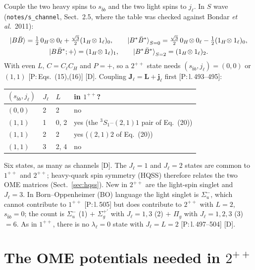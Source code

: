 \documentclass[11pt,a4paper]{article}
\newcommand{\tagP}[1]{\textcolor{blue!65!black}{\textsf{\small[P:\,#1]}}}
\newcommand{\tagD}{\textcolor{orange!85!black}{\textsf{\small[D]}}}
\newcommand{\BB}{B\bar B}
\newcommand{\BBst}{B\bar B^*}
\newcommand{\BstBst}{B^*\bar B^*}
\begin{document}
Couple the two heavy spins to $s_{\bar bb}$ and the two light spins to $j_\ell$. In $S$ wave (\texttt{notes/s\_channel}, Sect.~2.5, where the table was checked against Bondar \emph{et al.}\ 2011):
\begin{gather}
\ket{\BB}=\tfrac12\,0_H\!\otimes0_\ell+\tfrac{\sqrt3}{2}(1_H\!\otimes1_\ell)_0,\qquad
\ket{\BstBst}_{S=0}=\tfrac{\sqrt3}{2}\,0_H\!\otimes0_\ell-\tfrac12(1_H\!\otimes1_\ell)_0,\notag\\
\ket{\BBst;+}=(1_H\!\otimes1_\ell)_1,\qquad
\ket{\BstBst}_{S=2}=(1_H\!\otimes1_\ell)_2 .
\label{eq:hl}
\end{gather}
With even $L$, $C=C_\ell C_H$ and $P=+$, so a $2^{++}$ state needs $(s_{\bar bb},j_\ell)=(0,0)$ or $(1,1)$ \tagP{Eqs.~(15),(16)} \tagD. Coupling $\bm J_\ell=\bm L+\bm j_\ell$ first \tagP{l.\,493--495}:
\begin{center}
\small
\begin{tabular}{llll}
\toprule
$(s_{\bar bb},j_\ell)$ & $J_\ell$ & $L$ & in $1^{++}$?\\
\midrule
$(0,0)$ & 2 & 2 & no\\
$(1,1)$ & 1 & 0, 2 & yes (the $^3S_1$--$(2,1)1$ pair of Eq.~(20))\\
$(1,1)$ & 2 & 2 & yes ($(2,1)2$ of Eq.~(20))\\
$(1,1)$ & 3 & 2, 4 & no\\
\bottomrule
\end{tabular}
\end{center}
Six states, as many as channels \tagD. The $J_\ell=1$ and $J_\ell=2$ states are common to $1^{++}$ and $2^{++}$; heavy-quark spin symmetry (HQSS) therefore relates the two OME matrices (Sect.~\ref{sec:hqss}). New in $2^{++}$ are the light-spin singlet and $J_\ell=3$. In Born--Oppenheimer (BO) language the light singlet is $\Sigma_u^-$, which cannot contribute to $1^{++}$ \tagP{l.\,505} but does contribute to $2^{++}$ with $L=2$, $s_{\bar bb}=0$; the count is $\Sigma_u^-$ (1) $+$ $\Sigma_g^{+\prime}$ with $J_\ell=1,3$ (2) $+$ $\Pi_g$ with $J_\ell=1,2,3$ (3) $=6$. As in $1^{++}$, there is no $\lambda_\ell=0$ state with $J_\ell=L=2$ \tagP{l.\,497--504} \tagD.

\section{The OME potentials needed in $2^{++}$}
\label{sec:ome}
\end{document}
